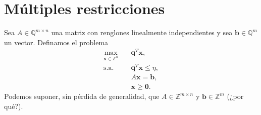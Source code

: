 \documentclass[aspectratio=169,professionalfonts]{beamer}
\newcommand{\Z}{\mathbb{Z}}
\newcommand{\Q}{\mathbb{Q}}
\renewcommand{\vec}[1]{\boldsymbol{#1}}
\begin{document}

\section{Múltiples restricciones}
\begin{frame}
	Sea $A \in \Q^{m \times n}$ una matriz con renglones linealmente
	independientes y sea $\vec{b} \in \Q^m$ un vector. Definamos el problema
	\begin{subequations}
		\begin{align}
			\max_{\vec{x} \in \Z^n} \quad
				& \vec{q}^T\vec{x}, \\
			\text{s.a.} \quad
					& \vec{q}^T\vec{x} \leq \eta, \\
					& A\vec{x} = \vec{b}, \\
					& \vec{x} \geq \vec{0}. \nonumber
		\end{align}
	\end{subequations}
	Podemos suponer, sin pérdida de generalidad, que $A \in \Z^{m \times n}$ y
	$\vec{b} \in \Z^m$ (¿por qué?).
\end{frame}
\end{document}
